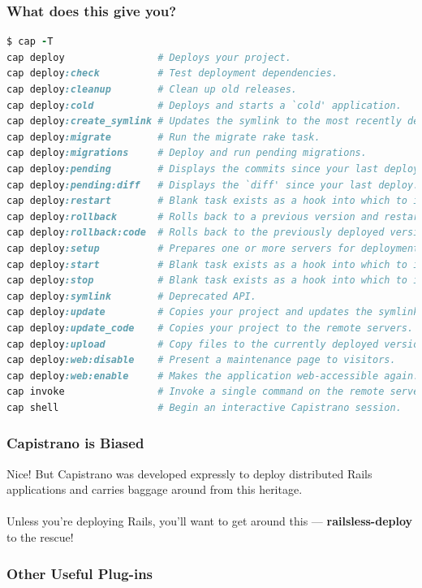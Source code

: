 \documentclass[t,handout]{beamer}
\begin{document}
\begin{frame}[fragile]
\frametitle{What does this give you?}
\begin{lstlisting}[frame=none,language=Ruby,basicstyle=\tiny\ttfamily\color{black},commentstyle=\tiny\ttfamily\color{red}]
$ cap -T
cap deploy                # Deploys your project.
cap deploy:check          # Test deployment dependencies.
cap deploy:cleanup        # Clean up old releases.
cap deploy:cold           # Deploys and starts a `cold' application.
cap deploy:create_symlink # Updates the symlink to the most recently deployed...
cap deploy:migrate        # Run the migrate rake task.
cap deploy:migrations     # Deploy and run pending migrations.
cap deploy:pending        # Displays the commits since your last deploy.
cap deploy:pending:diff   # Displays the `diff' since your last deploy.
cap deploy:restart        # Blank task exists as a hook into which to install...
cap deploy:rollback       # Rolls back to a previous version and restarts.
cap deploy:rollback:code  # Rolls back to the previously deployed version.
cap deploy:setup          # Prepares one or more servers for deployment.
cap deploy:start          # Blank task exists as a hook into which to install...
cap deploy:stop           # Blank task exists as a hook into which to install...
cap deploy:symlink        # Deprecated API.
cap deploy:update         # Copies your project and updates the symlink.
cap deploy:update_code    # Copies your project to the remote servers.
cap deploy:upload         # Copy files to the currently deployed version.
cap deploy:web:disable    # Present a maintenance page to visitors.
cap deploy:web:enable     # Makes the application web-accessible again.
cap invoke                # Invoke a single command on the remote servers.
cap shell                 # Begin an interactive Capistrano session.
\end{lstlisting}
\end{frame}

\begin{frame}
\frametitle{Capistrano is Biased}
Nice! But Capistrano was developed expressly to deploy distributed Rails applications and carries baggage around from this heritage.\\~\\

Unless you're deploying Rails, you'll want to get around this --- {\bf railsless-deploy} to the rescue!
\end{frame}

\begin{frame}
\frametitle{Other Useful Plug-ins}
\end{frame}
\end{document}
